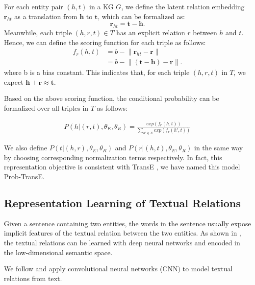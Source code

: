 \documentclass[11pt,a4paper]{article}
\begin{document}
For each entity pair $(h, t)$ in a KG $G$, we define the latent relation embedding $\mathbf{r}_{ht}$ as a translation from $\mathbf{h}$ to $\mathbf{t}$, which can be formalized as:
\begin{equation}
\textbf{r}_{ht} = \textbf{t} - \textbf{h}.
\end{equation}
Meanwhile, each triple $(h, r, t) \in T$ has an explicit relation $r$ between $h$ and $t$. Hence, we can define the scoring function for each triple as follows:
\begin{align}
f_r(h, t) & = b - \lVert \textbf{r}_{ht} - \textbf{r} \rVert  \\\nonumber
		& = b - \lVert (\textbf{t} - \textbf{h}) - \textbf{r}  \rVert.
\end{align}
where b is a bias constant. This indicates that, for each triple $(h, r, t)$ in $T$, we expect $\textbf{h} + \textbf{r} \approx \textbf{t}$.

Based on the above scoring function, the conditional probability can be formalized over all triples in $T$ as follows:

\begin{align}
P(h|(r, t),{\theta_E, \theta_R}) = \frac{exp(f_r(h, t))}{\sum_{h' \in E} exp(f_r(h', t))}
\end{align}

We also define $P(t|(h, r), {\theta_E, \theta_R})$ and $P(r|(h, t),{\theta_E, \theta_R})$ in the same way by choosing corresponding normalization terms respectively. In fact, this representation objective is consistent with TransE \cite{bordes2013translating}, we have named this model Prob-TransE.

\subsection{Representation Learning of Textual Relations}
\label{sec:relation}

Given a sentence containing two entities, the words in the sentence usually expose implicit features of the textual relation between the two entities. As shown in \cite{zeng2014relation,toutanova2015representing,lin2016neural}, the textual relations can be learned with deep neural networks and encoded in the low-dimensional semantic space.

We follow \cite{lin2016neural} and apply convolutional neural networks (CNN) to model textual relations from text. 

\end{document}
